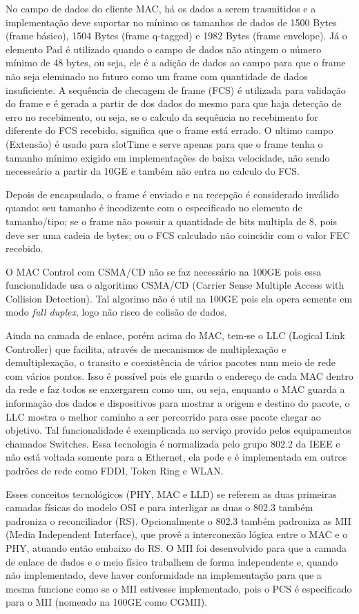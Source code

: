 \documentclass[a4paper,12pt]{article}
\begin{document}
No campo de dados do cliente MAC, há os dados a serem trasmitidos e a implementação deve suportar no mínimo os tamanhos de dados de 1500 Bytes (frame básico), 1504 Bytes (frame q-tagged) e 1982 Bytes (frame envelope). Já o elemento Pad é utilizado quando o campo de dados não atingem o número mínimo de 48 bytes, ou seja, ele é a adição de dados ao campo para que o frame não seja eleminado no futuro como um frame com quantidade de dados insuficiente. A sequência de checagem de frame (FCS) é utilizada para validação do frame e é gerada a partir de dos dados do mesmo para que haja detecção de erro no recebimento, ou seja, se o calculo da sequência no recebimento for diferente do FCS recebido, significa que o frame está errado. O ultimo campo (Extensão) é usado para slotTime e serve apenas para que o frame tenha o tamanho mínimo exigido em implementações de baixa velocidade, não sendo necesseário a partir da 10GE e também não entra no calculo do FCS.

Depois de encapsulado, o frame é enviado e na recepção é considerado inválido quando: seu tamanho é incodizente com o especificado no elemento de tamanho/tipo; se o frame não possuir a quantidade de bits multipla de 8, pois deve ser uma cadeia de bytes; ou o FCS calculado não coincidir com o valor FEC recebido.

O MAC Control com CSMA/CD não se faz necessário na 100GE pois essa funcionalidade usa o algoritimo CSMA/CD (Carrier Sense Multiple Access with Collision Detection). Tal algorimo não é util na 100GE pois ela opera semente em modo \textit{full duplex}, logo não risco de colisão de dados.

Ainda na camada de enlace, porém acima do MAC, tem-se o LLC (Logical Link Controller) que facilita, através de mecanismos de multiplexação e demultiplexação, o transito e coexistência de vários pacotes num meio de rede com vários pontos. Isso é possível pois ele guarda o endereço de cada MAC dentro da rede e faz todos se enxergarem como um, ou seja, enquanto o MAC guarda a informação dos dados e dispositivos para mostrar a origem e destino do pacote, o LLC mostra o melhor caminho a ser percorrido para esse pacote chegar ao objetivo. Tal funcionalidade é exemplicada no serviço provido pelos equipamentos chamados Switches. Essa tecnologia é normalizada pelo grupo 802.2 da IEEE e não está voltada somente para a Ethernet, ela pode e é implementada em outros padrões de rede como FDDI, Token Ring e WLAN.

Esses conceitos tecnológicos (PHY, MAC e LLD) se referem as duas primeiras camadas físicas do modelo OSI e para interligar as duas o 802.3 também padroniza o reconciliador (RS). Opcionalmente o 802.3 também padroniza as MII (Media Independent Interface), que provê a interconexão lógica entre o MAC e o PHY, atuando então embaixo do RS. O MII foi desenvolvido para que a camada de enlace de dados e o meio físico trabalhem de forma independente e, quando não implementado, deve haver conformidade na implementação para que a mesma funcione como se o MII estivesse implementado, pois o PCS é especificado para o MII (nomeado na 100GE como CGMII).
\end{document}
